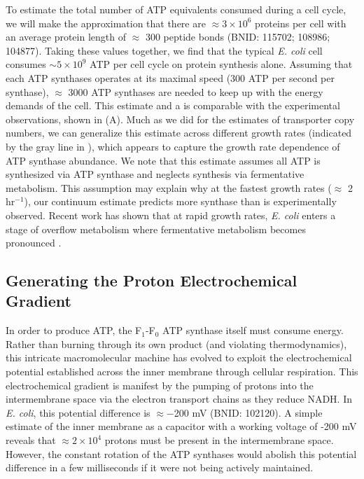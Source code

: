 To estimate the total number of ATP equivalents consumed during a cell cycle,
we will make the approximation that there are $\approx 3\times10^6$ proteins
per cell with an average protein length of $\approx$ 300 peptide bonds (BNID:
115702; 108986; 104877). Taking these values together, we find that the
typical \textit{E. coli} cell consumes $\sim 5 \times 10^9$ ATP per cell
cycle on protein synthesis alone. Assuming that each ATP synthases operates at
its maximal speed (300 ATP per second per synthase), $\approx$ 3000 ATP synthases are
needed to keep up with the energy demands of the cell. This estimate and a
is comparable with the experimental observations,  shown in  (A). Much as we did for the estimates of transporter copy
numbers, we can generalize this estimate across different growth rates (indicated by the gray
line in ), which appears to capture the growth rate
dependence of ATP synthase abundance. We note that this estimate assumes all ATP
is synthesized via ATP synthase and neglects synthesis via fermentative
metabolism. This assumption may explain why at the fastest growth rates
($\approx$ 2 hr$^{-1}$), our continuum estimate predicts more synthase than is
experimentally observed. Recent work has shown that at rapid growth rates,
\textit{E. coli} enters a stage of overflow metabolism where fermentative metabolism
becomes pronounced \cite{szenk2017}. 


\subsection{Generating the Proton Electrochemical Gradient}
In order to produce ATP, the F$_1$-F$_0$ ATP synthase itself must consume
energy. Rather than burning through its own product (and violating
thermodynamics), this intricate macromolecular machine has evolved to exploit
the electrochemical potential established across the inner membrane through
cellular respiration. This electrochemical gradient is manifest by the pumping
of protons into the intermembrane space via the electron transport chains as
they reduce NADH. In \textit{E. coli}, this potential difference is $\approx
-$200 mV (BNID: 102120). A simple estimate of the inner membrane as a capacitor
with a working voltage of -200 mV reveals that $\approx 2\times 10^4$ protons
must be present in the intermembrane space. However, the constant rotation of the ATP synthases would abolish
this potential difference in a few milliseconds if it were not being actively
maintained. 


